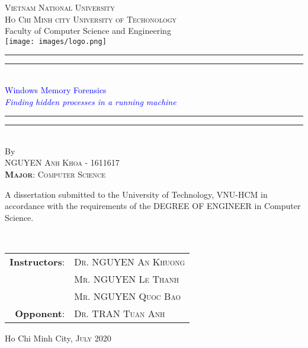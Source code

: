 \begin{titlingpage}
\begin{singlespace}

\begin{center}
{\Large \textsc{Vietnam National University \\Ho Chi Minh city University of Techonology}\\
\vspace{3mm}
Faculty of Computer Science and Engineering
}\\
\vspace{10mm}
\texttt{[image: images/logo.png]}\\
\vspace{1cm}
\rule[0.5ex]{\linewidth}{2pt}\vspace*{-\baselineskip}\vspace*{3.2pt}
\rule[0.5ex]{\linewidth}{1pt}\\[\baselineskip]
{\huge \textcolor{blue}{Windows Memory Forensics}}\\[4mm]
{\Large \textit{\textcolor{blue}{Finding hidden processes in a running machine}}}\\
\rule[0.5ex]{\linewidth}{1pt}\vspace*{-\baselineskip}\vspace{3.2pt}
\rule[0.5ex]{\linewidth}{2pt}\\
\vspace{6.5mm}
{\large By}\\
\vspace{6.5mm}
{\Large\textsc{NGUYEN Anh Khoa - 1611617}}\\
{\Large\textsc{\textbf{Major}: Computer Science}}\\
\vspace{12mm}

\begin{minipage}{12cm}
A dissertation submitted to the University of Technology, VNU-HCM in accordance with the requirements of the DEGREE OF ENGINEER in Computer Science.
\end{minipage}\\

\vspace{6mm}
\begin{center}
\begin{tabular}{ r l }
\textbf{Instructors}:& \Large \textsc{Dr. NGUYEN An Khuong}\\
& \Large \textsc{Mr. NGUYEN Le Thanh}\\
& \Large \textsc{Mr. NGUYEN Quoc Bao}\\
\textbf{Opponent}:& \Large \textsc{Dr. TRAN Tuan Anh}\\
\end{tabular}
\end{center}
\vspace{7mm}
{\large Ho Chi Minh City, \textsc{July 2020}}
\end{center}
\end{singlespace}
\end{titlingpage}
